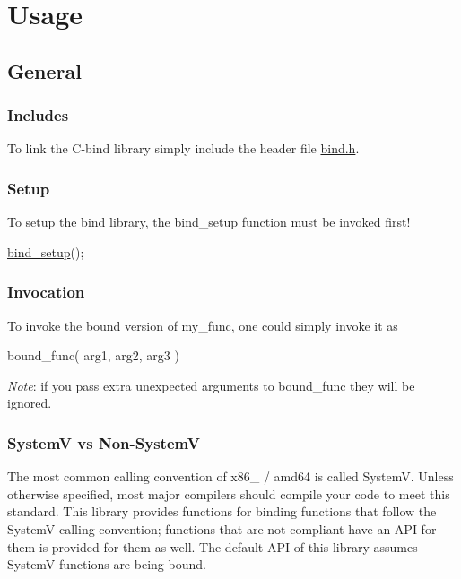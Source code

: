 \section*{Usage}

\subsection*{General}

\subsubsection*{Includes}

To link the {\ttfamily C-\/bind} library simply include the header file {\ttfamily \hyperlink{bind_8h}{bind.\+h}}.

\subsubsection*{Setup}

To setup the bind library, the {\ttfamily bind\+\_\+setup} function must be invoked first! 
\begin{DoxyCode}
\hyperlink{bind_8c_a57d49e18c9326489d842187e2a1e0086}{bind\_setup}();
\end{DoxyCode}


\subsubsection*{Invocation}

To invoke the bound version of {\ttfamily my\+\_\+func}, one could simply invoke it as 
\begin{DoxyCode}
bound\_func( arg1, arg2, arg3 )
\end{DoxyCode}
 {\itshape Note}\+: if you pass extra unexpected arguments to {\ttfamily bound\+\_\+func} they will be ignored.

\subsubsection*{SystemV vs Non-\/\+SystemV}

The most common calling convention of {\ttfamily x86\+\_} / {\ttfamily amd64} is called SystemV. Unless otherwise specified, most major compilers should compile your code to meet this standard. This library provides functions for binding functions that follow the SystemV calling convention; functions that are not compliant have an A\+PI for them is provided for them as well. The default A\+PI of this library assumes SystemV functions are being bound.

